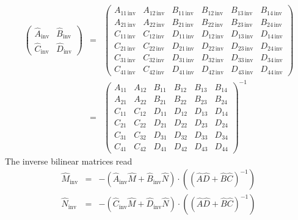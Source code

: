 \documentclass[12pt,a4paper,twoside,openright,BCOR10mm,headsepline,titlepage,abstracton,chapterprefix,final]{scrreprt}
\begin{document}
\begin{eqnarray}
 \begin{pmatrix}
  \hat{A}_{\text{inv}} & \hat{B}_{\text{inv}} \\ \hat{C}_{\text{inv}} & \hat{D}_{\text{inv}}
 \end{pmatrix}
 &=&
 \begin{pmatrix}
  A_{11\,\text{inv}} & A_{12\,\text{inv}} & B_{11\,\text{inv}} & B_{12\,\text{inv}} & B_{13\,\text{inv}} & B_{14\,\text{inv}} \\
  A_{21\,\text{inv}} & A_{22\,\text{inv}} & B_{21\,\text{inv}} & B_{22\,\text{inv}} & B_{23\,\text{inv}} & B_{24\,\text{inv}} \\
  C_{11\,\text{inv}} & C_{12\,\text{inv}} & D_{11\,\text{inv}} & D_{12\,\text{inv}} & D_{13\,\text{inv}} & D_{14\,\text{inv}} \\
  C_{21\,\text{inv}} & C_{22\,\text{inv}} & D_{21\,\text{inv}} & D_{22\,\text{inv}} & D_{23\,\text{inv}} & D_{24\,\text{inv}} \\
  C_{31\,\text{inv}} & C_{32\,\text{inv}} & D_{31\,\text{inv}} & D_{32\,\text{inv}} & D_{33\,\text{inv}} & D_{34\,\text{inv}} \\
  C_{41\,\text{inv}} & C_{42\,\text{inv}} & D_{41\,\text{inv}} & D_{42\,\text{inv}} & D_{43\,\text{inv}} & D_{44\,\text{inv}}
 \end{pmatrix}
 \\
 &=&
 \begin{pmatrix}
  A_{11} & A_{12} & B_{11} & B_{12} & B_{13} & B_{14} \\
  A_{21} & A_{22} & B_{21} & B_{22} & B_{23} & B_{24} \\
  C_{11} & C_{12} & D_{11} & D_{12} & D_{13} & D_{14} \\
  C_{21} & C_{22} & D_{21} & D_{22} & D_{23} & D_{24} \\
  C_{31} & C_{32} & D_{31} & D_{32} & D_{33} & D_{34} \\
  C_{41} & C_{42} & D_{41} & D_{42} & D_{43} & D_{44}
 \end{pmatrix}^{-1}
\end{eqnarray}
The inverse bilinear matrices read
\begin{subequations}
\begin{eqnarray}
 \hat{M}_{\text{inv}} &=& - (\hat{A}_{\text{inv}} \hat{M} + \hat{B}_{\text{inv}} \hat{N}) \cdot \left( ( \hat{A} \hat{D} + \hat{B} \hat{C} )^{-1} \right)\\
 \hat{N}_{\text{inv}} &=& - (\hat{C}_{\text{inv}} \hat{M} + \hat{D}_{\text{inv}} \hat{N}) \cdot \left( ( \hat{A} \hat{D} + \hat{B} \hat{C} )^{-1} \right)
\end{eqnarray}
\end{subequations}
\end{document}
